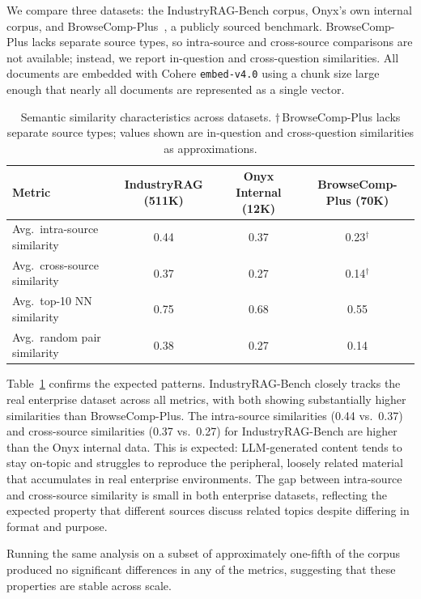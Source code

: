 \documentclass{article}
\begin{document}
We compare three datasets: the IndustryRAG-Bench corpus, Onyx's own internal corpus, and BrowseComp-Plus~\citep{chen2025browsecomp}, a publicly sourced benchmark. BrowseComp-Plus lacks separate source types, so intra-source and cross-source comparisons are not available; instead, we report in-question and cross-question similarities. All documents are embedded with Cohere \texttt{embed-v4.0} using a chunk size large enough that nearly all documents are represented as a single vector.

\begin{table}[t]
  \caption{Semantic similarity characteristics across datasets. $\dagger$\,BrowseComp-Plus lacks separate source types; values shown are in-question and cross-question similarities as approximations.}
  \label{tab:similarity}
  \centering
  \small
  \begin{tabular}{p{5.5cm}ccc}
    \toprule
    Metric & IndustryRAG (511K) & Onyx Internal (12K) & BrowseComp-Plus (70K) \\
    \midrule
    Avg.\ intra-source similarity    & 0.44 & 0.37 & 0.23$^\dagger$ \\
    Avg.\ cross-source similarity    & 0.37 & 0.27 & 0.14$^\dagger$ \\
    Avg.\ top-10 NN similarity       & 0.75 & 0.68 & 0.55 \\
    Avg.\ random pair similarity     & 0.38 & 0.27 & 0.14 \\
    \bottomrule
  \end{tabular}
\end{table}

Table~\ref{tab:similarity} confirms the expected patterns. IndustryRAG-Bench closely tracks the real enterprise dataset across all metrics, with both showing substantially higher similarities than BrowseComp-Plus. The intra-source similarities (0.44 vs.\ 0.37) and cross-source similarities (0.37 vs.\ 0.27) for IndustryRAG-Bench are higher than the Onyx internal data. This is expected: LLM-generated content tends to stay on-topic and struggles to reproduce the peripheral, loosely related material that accumulates in real enterprise environments. The gap between intra-source and cross-source similarity is small in both enterprise datasets, reflecting the expected property that different sources discuss related topics despite differing in format and purpose.

Running the same analysis on a subset of approximately one-fifth of the corpus produced no significant differences in any of the metrics, suggesting that these properties are stable across scale.
\end{document}
